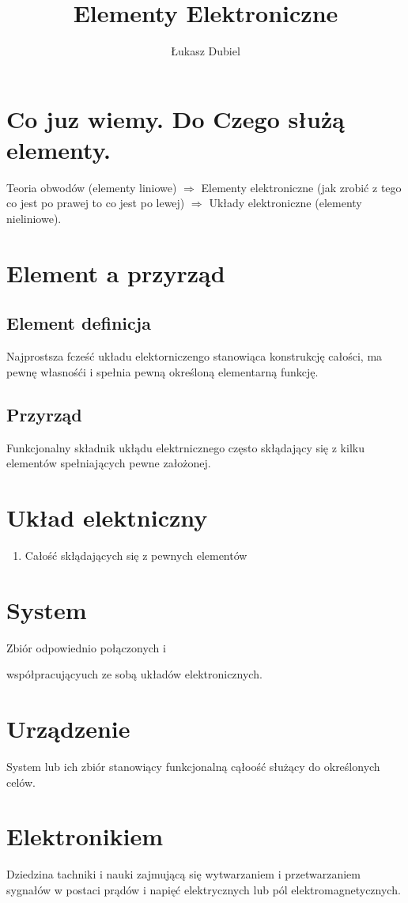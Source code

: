 \documentclass[11pt]{article}
\author{Łukasz Dubiel}
\title{Elementy Elektroniczne}
\begin{document}
\maketitle

\section{Co juz wiemy. Do Czego służą elementy.}

Teoria obwodów (elementy liniowe) $ \Rightarrow $ Elementy elektroniczne (jak zrobić z tego co jest po prawej to co jest po lewej) $ \Rightarrow $ Układy elektroniczne (elementy nieliniowe).


\section{Element a przyrząd}
\subsection{Element definicja}
Najprostsza fcześć układu elektorniczengo stanowiąca konstrukcję całości, ma pewnę własnośći i spełnia pewną określoną elementarną funkcję. 
\subsection{Przyrząd} 
Funkcjonalny składnik ukłądu elektrnicznego często skłądający się z kilku elementów spełniających pewne założonej.
\section{Układ elektniczny }
\begin{enumerate}
\item{Całość skłądających się z pewnych elementów}
\end{enumerate}

\section{System}
Zbiór odpowiednio połączonych i

współpracującyuch ze sobą układów elektronicznych.

\section{Urządzenie}
System lub ich zbiór stanowiący funkcjonalną cąłoość służący do określonych celów.

\section{Elektronikiem}
Dziedzina tachniki i nauki zajmującą się wytwarzaniem i przetwarzaniem sygnałów w postaci prądów i napięć elektrycznych lub pól elektromagnetycznych.
\end{document}
